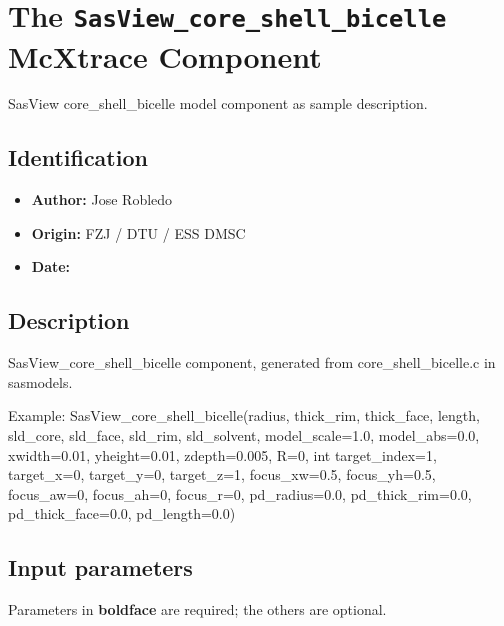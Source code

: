 \section{The \texttt{SasView\_core\_shell\_bicelle} McXtrace Component}
SasView core\_shell\_bicelle model component as sample description.

\subsection*{Identification}
\begin{itemize}
  \item \textbf{Author:} Jose Robledo
  \item \textbf{Origin:} FZJ / DTU / ESS DMSC
  \item \textbf{Date:} 
\end{itemize}

\subsection*{Description}
SasView\_core\_shell\_bicelle component, generated from core\_shell\_bicelle.c in sasmodels.

Example: SasView\_core\_shell\_bicelle(radius, thick\_rim, thick\_face, length, sld\_core, sld\_face, sld\_rim, sld\_solvent, model\_scale=1.0, model\_abs=0.0, xwidth=0.01, yheight=0.01, zdepth=0.005, R=0, int target\_index=1, target\_x=0, target\_y=0, target\_z=1, focus\_xw=0.5, focus\_yh=0.5, focus\_aw=0, focus\_ah=0, focus\_r=0, pd\_radius=0.0, pd\_thick\_rim=0.0, pd\_thick\_face=0.0, pd\_length=0.0)

\subsection*{Input parameters}
Parameters in \textbf{boldface} are required; the others are optional.

